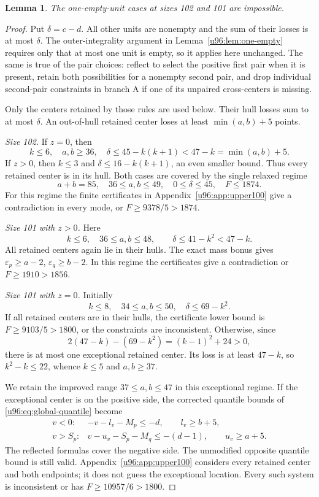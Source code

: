 \documentclass[11pt,a4paper]{article}
\newtheorem{lemma}[theorem]{Lemma}
\theoremstyle{remark}
\begin{document}
\begin{lemma}\label{u96:lem:one-empty100}
The one-empty-unit cases at sizes 102 and 101 are impossible.
\end{lemma}
\begin{proof}
Put $\delta=c-d$. All other units are nonempty and the sum of their losses
is at most $\delta$. The outer-integrality argument in
Lemma~\ref{u96:lem:one-empty} requires only that at most one unit is empty,
so it applies here unchanged. The same is true of the pair choices:
reflect to select the positive first pair when it is present, retain both
possibilities for a nonempty second pair, and drop individual second-pair
constraints in branch A if one of its unpaired cross-centers is missing.

Only the centers retained by those rules are used below. Their hull losses
sum to at most $\delta$. An out-of-hull retained center loses at least
$\min(a,b)+5$ points.

\emph{Size 102.} If $z=0$, then
\[
 k\leq6,\quad a,b\geq36,\quad
 \delta\leq45-k(k+1)<47-k=\min(a,b)+5.
\]
If $z>0$, then $k\leq3$ and $\delta\leq16-k(k+1)$, an even smaller
bound. Thus every retained center is in its hull. Both cases are covered
by the single relaxed regime
\[
 a+b=85,\quad36\leq a,b\leq49,\quad0\leq\delta\leq45,
 \quad F\leq1874.
\]
For this regime the finite certificates in Appendix~\ref{u96:app:upper100}
give a contradiction in every mode, or $F\geq9378/5>1874$.

\emph{Size 101 with $z>0$.} Here
\[
 k\leq6,\quad36\leq a,b\leq48,\qquad
 \delta\leq41-k^2<47-k.
\]
All retained centers again lie in their hulls. The exact mass bonus gives
$\varepsilon_p\geq a-2$, $\varepsilon_q\geq b-2$. In this regime the
certificates give a contradiction or $F\geq1910>1856$.

\emph{Size 101 with $z=0$.} Initially
\[
 k\leq8,\quad34\leq a,b\leq50,\quad\delta\leq69-k^2.
\]
If all retained centers are in their hulls, the certificate lower bound
is $F\geq9103/5>1800$, or the constraints are inconsistent.
Otherwise, since
\[
 2(47-k)-(69-k^2)=(k-1)^2+24>0,
\]
there is at most one exceptional retained center. Its loss is at least
$47-k$, so $k^2-k\leq22$, whence $k\leq5$ and $a,b\geq37$.

We retain the improved range $37\leq a,b\leq47$ in this exceptional
regime. If the exceptional center is on the positive side, the corrected
quantile bounds of \eqref{u96:eq:global-quantile} become
\[
 \begin{array}{ll}
 v<0:&-v-l_v-M_p\leq-d,\qquad l_v\geq b+5,\\
 v>S_p:&v-u_v-S_p-M_q\leq-(d-1),\qquad u_v\geq a+5.
 \end{array}
\]
The reflected formulas cover the negative side. The unmodified opposite
quantile bound is still valid. Appendix~\ref{u96:app:upper100} considers every
retained center and both endpoints; it does not guess the exceptional
location. Every such system is inconsistent or has
$F\geq10957/6>1800$.


\end{proof}
\end{document}
